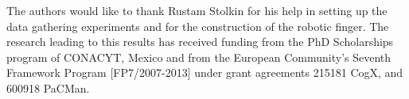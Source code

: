 \documentclass[journal]{IEEEtran}
\begin{document}
The authors would like to thank Rustam Stolkin for his help in setting up the data gathering experiments and for the construction of the robotic finger. The research leading to this results has received funding from the PhD Scholarships program of CONACYT, Mexico and from the European Community's Seventh Framework Program [FP7/2007-2013] under grant agreements 215181 CogX, and 600918 PaCMan.


\ifCLASSOPTIONcaptionsoff
  \newpage
\fi





%


%
% 
% 

% 
\end{document}
